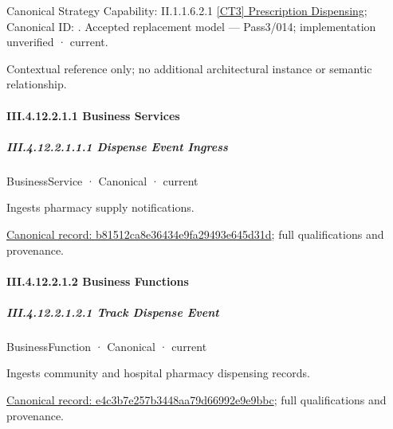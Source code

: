 {\small Canonical Strategy Capability: II.1.1.6.2.1 \hyperref[element:2243de4f266e4ab6ba7964a1799f2c7e]{[CT3] Prescription Dispensing}; Canonical ID: \texttt{}. Accepted replacement model — Pass3/014; implementation unverified · current.}\par
Contextual reference only; no additional architectural instance or semantic relationship.\par
\paragraph*{III.4.12.2.1.1 Business Services}
\label{navigation:III.4.12.2.1.1}

\subparagraph*{III.4.12.2.1.1.1 Dispense Event Ingress}
\label{navigation:III.4.12.2.1.1.1}

\label{element:b81512ca8e36434e9fa29493e645d31d}
{\small BusinessService · Canonical · current}\par

Ingests pharmacy supply notifications.


{\footnotesize \href{../../../../continuum/business/business-service/b81512ca8e36434e9fa29493e645d31d.md}{Canonical record: b81512ca8e36434e9fa29493e645d31d}; full qualifications and provenance.}\par
\paragraph*{III.4.12.2.1.2 Business Functions}
\label{navigation:III.4.12.2.1.2}

\subparagraph*{III.4.12.2.1.2.1 Track Dispense Event}
\label{navigation:III.4.12.2.1.2.1}

\label{element:e4c3b7e257b3448aa79d66992e9e9bbc}
{\small BusinessFunction · Canonical · current}\par

Ingests community and hospital pharmacy dispensing records.


{\footnotesize \href{../../../../continuum/business/business-function/e4c3b7e257b3448aa79d66992e9e9bbc.md}{Canonical record: e4c3b7e257b3448aa79d66992e9e9bbc}; full qualifications and provenance.}\par
